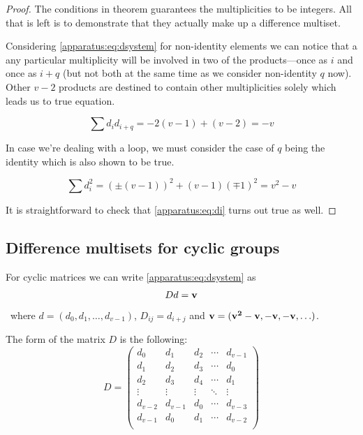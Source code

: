     \begin{proof}
        The conditions in theorem guarantees the multiplicities to be integers. All that is left is to demonstrate that they actually make up a difference multiset.
        
        Considering \eqref{apparatus:eq:dsystem} for non-identity elements we can notice that a any particular multiplicity will be involved in two of the products---once as $i$ and once as $i+q$ (but not both at the same time as we consider non-identity $q$ now). Other $v-2$ products are destined to contain other multiplicities solely which leads us to true equation.
        
        \begin{equation}
            \sum d_i d_{i+q} = -2(v-1) + (v-2) = -v
        \end{equation}

        In case we're dealing with a loop, we must consider the case of $q$ being the identity which is also shown to be true.
        
        \begin{equation}
            \sum d_i^2  = \left( \pm (v-1) \right)^2 + (v-1) \left( \mp 1 \right)^2 = v^2 - v
        \end{equation}
    
        It is straightforward to check that \eqref{apparatus:eq:di} turns out true as well.
    \end{proof}

\subsection{Difference multisets for cyclic groups}
    For cyclic matrices we can write \eqref{apparatus:eq:dsystem} as
    \begin{equation}
        D d = \bf v
    \end{equation}\
    where $d = (d_0, d_1, \ldots, d_{v-1})$, $D_{ij} = d_{i+j}$ and $\bf v = (v^2-v, -v, -v, \ldots)$.
    
    The form of the matrix $D$ is the following:
    \begin{equation}
        \label{general:eq:anticirculant_matrix}
        D =
        \begin{pmatrix}
            d_0 & d_1 & d_2 & \cdots & d_{v-1} \\ 
            d_1 & d_2 & d_3 & \cdots & d_0 \\
            d_2 & d_3 & d_4 & \cdots & d_1 \\
            \vdots & \vdots & \vdots & \ddots & \vdots \\
            d_{v-2} & d_{v-1} & d_0 & \cdots & d_{v-3} \\
            d_{v-1} & d_0 & d_1 & \cdots & d_{v-2} \\
        \end{pmatrix}
    \end{equation}
    
